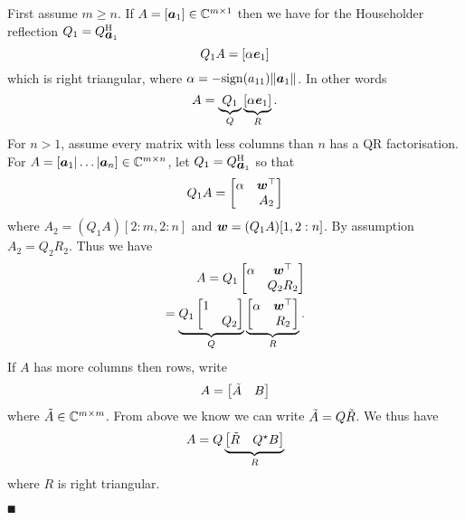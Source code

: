 First assume $m \ensuremath{\geq} n$. If $A = [\bm{{\mbox{\boldmath$a$\unboldmath}}}_1] \in {\mathbb C}^{m \times 1}$ then we have for the Householder reflection $Q_1 = Q_{\bm{{\mbox{\boldmath$a$\unboldmath}}}_1}^{\rm H}$
\[
Q_1 A = [\alpha \bm{{\mbox{\boldmath$e$\unboldmath}}}_1]
\]
which is right triangular, where $\alpha = -{\rm sign}(a_{11}) \|\bm{{\mbox{\boldmath$a$\unboldmath}}}_1\|$.  In other words 
\[
A = \underbrace{Q_1}_Q \underbrace{[\alpha \bm{{\mbox{\boldmath$e$\unboldmath}}}_1]}_R.
\]
For $n > 1$, assume every matrix with less columns than $n$ has a QR factorisation. For $A = [\bm{{\mbox{\boldmath$a$\unboldmath}}}_1|\ldots|\bm{{\mbox{\boldmath$a$\unboldmath}}}_n] \in {\mathbb C}^{m \times n}$, let $Q_1 = Q_{\bm{{\mbox{\boldmath$a$\unboldmath}}}_1}^{\rm H}$ so that
\[
Q_1 A =  \begin{bmatrix} \alpha & \bm{{\mbox{\boldmath$w$\unboldmath}}}^\top \\ & A_2 \end{bmatrix}
\]
where $A_2 = (Q_1 A)[2:m,2:n]$ and $\bm{{\mbox{\boldmath$w$\unboldmath}}} = (Q_1 A)[1,2:n]$. By assumption $A_2 = Q_2 R_2$. Thus we have
\begin{align*}
A = Q_1 \begin{bmatrix} \alpha & \bm{{\mbox{\boldmath$w$\unboldmath}}}^\top \\ & Q_2 R_2 \end{bmatrix} \\
=\underbrace{Q_1 \begin{bmatrix} 1 \\ & Q_2 \end{bmatrix}}_Q  \underbrace{\begin{bmatrix} \alpha & \bm{{\mbox{\boldmath$w$\unboldmath}}}^\top \\ &  R_2 \end{bmatrix}}_R.
\end{align*}
If $A$ has more columns then rows, write 
\[
A = \begin{bmatrix} \tilde A & B \end{bmatrix}
\]
where $\tilde A \in {\mathbb C}^{m \times m}$. From above we know we can write $\tilde A = Q \tilde R$. We thus have
\[
A = Q \underbrace{\begin{bmatrix} \tilde R & Q^\star B \end{bmatrix}}_R
\]
where $R$ is right triangular.

\ensuremath{\QED}

